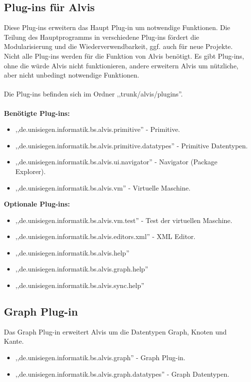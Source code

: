 \documentclass[10pt,a4paper,oneside]{scrbook}
\begin{document}
\subsection{Plug-ins für Alvis}
Diese Plug-ins erweitern das Haupt Plug-in um notwendige Funktionen. Die Teilung des Hauptprogramms in verschiedene Plug-ins fördert die Modularisierung und die Wiederverwendbarkeit, ggf. auch für neue Projekte.
\\
Nicht alle Plug-ins werden für die Funktion von Alvis benötigt. Es gibt Plug-ins, ohne die würde Alvis nicht funktionieren, andere erweitern Alvis um nützliche, aber nicht unbedingt notwendige Funktionen.
\\ \\
Die Plug-ins befinden sich im Ordner ,,trunk/alvis/plugins''.
\\ \\
\textbf{Benötigte Plug-ins:}
\begin{itemize}
\item ,,de.unisiegen.informatik.bs.alvis.primitive'' - Primitive.
\item ,,de.unisiegen.informatik.bs.alvis.primitive.datatypes'' - Primitive Datentypen.
\item ,,de.unisiegen.informatik.bs.alvis.ui.navigator'' - Navigator (Package Explorer).
\item ,,de.unisiegen.informatik.bs.alvis.vm'' - Virtuelle Maschine.
\end{itemize}
\textbf{Optionale Plug-ins:}
\begin{itemize}
\item ,,de.unisiegen.informatik.bs.alvis.vm.test'' - Test der virtuellen Maschine.
\item ,,de.unisiegen.informatik.bs.alvis.editors.xml'' - XML Editor.
\item ,,de.unisiegen.informatik.bs.alvis.help''
\item ,,de.unisiegen.informatik.bs.alvis.graph.help''
\item ,,de.unisiegen.informatik.bs.alvis.sync.help''
\end{itemize}
\subsection{Graph Plug-in}
Das Graph Plug-in erweitert Alvis um die Datentypen Graph, Knoten und Kante.
\begin{itemize}
\item ,,de.unisiegen.informatik.bs.alvis.graph'' - Graph Plug-in.
\item ,,de.unisiegen.informatik.bs.alvis.graph.datatypes'' - Graph Datentypen.
\end{itemize}
\end{document}
